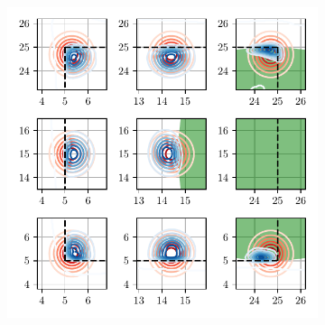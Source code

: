 \begin{figure}[h!]
    \begin{subfigure}[t]{0.48\textwidth}
        \includegraphics[width=\textwidth]{figures/BBNF/BBNF3_cluster_2019_10_03_11_38_39/BBNF3_density_array_2balls_00_000000.pdf}
        \vspace*{-0.7cm}
        \caption{}
        \label{fig:balls:space}
    \end{subfigure}%
    

\end{figure}
